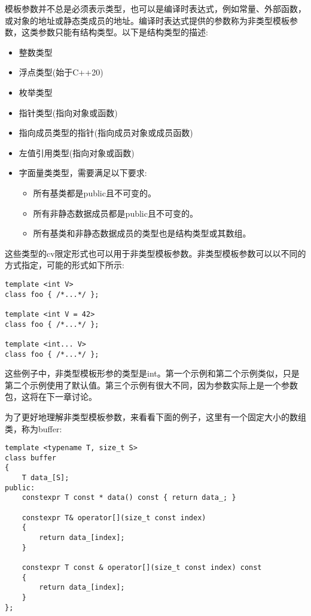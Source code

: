 
模板参数并不总是必须表示类型，也可以是编译时表达式，例如常量、外部函数，或对象的地址或静态类成员的地址。编译时表达式提供的参数称为非类型模板参数，这类参数只能有结构类型。以下是结构类型的描述:

\begin{itemize}
\item 
整数类型

\item 
浮点类型(始于C++20)

\item 
枚举类型

\item 
指针类型(指向对象或函数)

\item 
指向成员类型的指针(指向成员对象或成员函数)

\item 
左值引用类型(指向对象或函数)

\item 
字面量类类型，需要满足以下要求:
\begin{itemize}
\item 
所有基类都是public且不可变的。

\item 
所有非静态数据成员都是public且不可变的。

\item 
所有基类和非静态数据成员的类型也是结构类型或其数组。
\end{itemize}
\end{itemize}

这些类型的cv限定形式也可以用于非类型模板参数。非类型模板参数可以以不同的方式指定，可能的形式如下所示:

\begin{lstlisting}[style=styleCXX]
template <int V>
class foo { /*...*/ };

template <int V = 42>
class foo { /*...*/ };

template <int... V>
class foo { /*...*/ };
\end{lstlisting}

这些例子中，非类型模板形参的类型是int。第一个示例和第二个示例类似，只是第二个示例使用了默认值。第三个示例有很大不同，因为参数实际上是一个参数包，这将在下一章讨论。

为了更好地理解非类型模板参数，来看看下面的例子，这里有一个固定大小的数组类，称为buffer:

\begin{lstlisting}[style=styleCXX]
template <typename T, size_t S>
class buffer
{
	T data_[S];
public:
	constexpr T const * data() const { return data_; }
	
	constexpr T& operator[](size_t const index)
	{
		return data_[index];
	}

	constexpr T const & operator[](size_t const index) const
	{
		return data_[index];
	}
};
\end{lstlisting}

